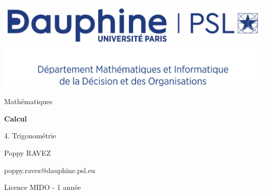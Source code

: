 \documentclass{report}
\author{Prénom NOM}
\begin{document}
\centering
\includegraphics[scale=0.08]{../../../logo/pdf/MIDO_centre}


\sffamily
\vspace{6cm}
\LARGE
\mdseries
Mathématiques

\huge
\bfseries
Calcul

4. Trigonométrie

\vspace{3cm}
\rmfamily

\mdseries
\makeatletter
\large
Poppy RAVEZ

\vspace{0.2cm}
\normalsize
poppy.ravez@dauphine.psl.eu

\vspace{0.2cm}
Licence MIDO - 1\iere{} année

\vspace{5cm}
\@date
\makeatother
\end{document}
